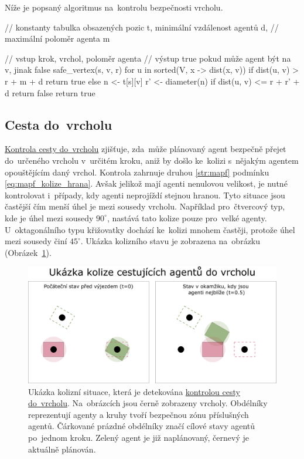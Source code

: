 Níže je popsaný algoritmus na~kontrolu bezpečnosti vrcholu.

\begin{code}[fontsize=\footnotesize]
// konstanty tabulka obsazených pozic t, minimální vzdálenost agentů d,
// maximální poloměr agenta m

// vstup krok, vrchol, poloměr agenta
// výstup true pokud může agent být na v, jinak false
safe_vertex(s, v, r)
  for u in sorted(V, x -> dist(x, v))
    if dist(u, v) > r + m + d
      return true
    else
      n <- t[s][v]
      r' <- diameter(n)
      if dist(u, v) <= r + r' + d
        return false
return true
\end{code}

\subsection{Cesta do~vrcholu}\label{subsec:cesta_do_vrcholu}


\hyperref[subsec:cesta_do_vrcholu]{Kontrola cesty do~vrcholu} zjišťuje,
zda~může plánovaný agent bezpečně přejet do~určeného vrcholu v~určitém kroku,
aniž by došlo ke~kolizi s~nějakým agentem opouštějícím daný vrchol.
Kontrola zahrnuje druhou \ref{str:mapf} podmínku
 \eqref{eq:mapf_kolize_hrana}.
Avšak jelikož mají agenti nenulovou velikost, je nutné kontrolovat i~případy, kdy agenti neprojíždí stejnou hranou.
Tyto situace jsou častější čím menší úhel je mezi sousedy vrcholu.
Například pro~čtvercový typ, kde je úhel mezi sousedy $90^\circ$, nastává tato kolize pouze pro~velké agenty.
U~oktagonálního typu křižovatky dochází ke~kolizi mnohem častěji, protože úhel mezi sousedy činí $45^\circ$.
Ukázka kolizního stavu je zobrazena na~obrázku (Obrázek~\ref{fig:kolize_cesta_do}).

\begin{figure}[h]
	\centering
	\includegraphics[width=\textwidth]{../img/kolize_cesta_do}
	\caption{
		Ukázka kolizní situace, která je detekována \hyperref[subsec:cesta_do_vrcholu]{kontrolou cesty do~vrcholu}.
		Na~obrázcích jsou černě zobrazeny vrcholy.
		Obdélníky reprezentují agenty a kruhy tvoří bezpečnou zónu příslušných agentů.
		Čárkované prázdné obdélníky značí cílové stavy agentů po~jednom kroku.
		Zelený agent je již naplánovaný, černevý je aktuálně plánován.
	}
	\label{fig:kolize_cesta_do}
\end{figure}


